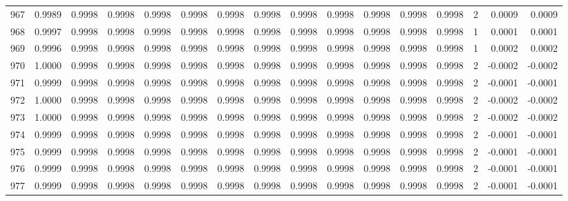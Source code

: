 \begin{tabular}{lrrrrrrrrrrrrrrr}
967 &      0.9989 &  0.9998 &  0.9998 &  0.9998 &  0.9998 &  0.9998 &  0.9998 &  0.9998 &  0.9998 &  0.9998 &   0.9998 &     0.9998 &      2 &                    0.0009 &                     0.0009 \\
968 &      0.9997 &  0.9998 &  0.9998 &  0.9998 &  0.9998 &  0.9998 &  0.9998 &  0.9998 &  0.9998 &  0.9998 &   0.9998 &     0.9998 &      1 &                    0.0001 &                     0.0001 \\
969 &      0.9996 &  0.9998 &  0.9998 &  0.9998 &  0.9998 &  0.9998 &  0.9998 &  0.9998 &  0.9998 &  0.9998 &   0.9998 &     0.9998 &      1 &                    0.0002 &                     0.0002 \\
970 &      1.0000 &  0.9998 &  0.9998 &  0.9998 &  0.9998 &  0.9998 &  0.9998 &  0.9998 &  0.9998 &  0.9998 &   0.9998 &     0.9998 &      2 &                   -0.0002 &                    -0.0002 \\
971 &      0.9999 &  0.9998 &  0.9998 &  0.9998 &  0.9998 &  0.9998 &  0.9998 &  0.9998 &  0.9998 &  0.9998 &   0.9998 &     0.9998 &      2 &                   -0.0001 &                    -0.0001 \\
972 &      1.0000 &  0.9998 &  0.9998 &  0.9998 &  0.9998 &  0.9998 &  0.9998 &  0.9998 &  0.9998 &  0.9998 &   0.9998 &     0.9998 &      2 &                   -0.0002 &                    -0.0002 \\
973 &      1.0000 &  0.9998 &  0.9998 &  0.9998 &  0.9998 &  0.9998 &  0.9998 &  0.9998 &  0.9998 &  0.9998 &   0.9998 &     0.9998 &      2 &                   -0.0002 &                    -0.0002 \\
974 &      0.9999 &  0.9998 &  0.9998 &  0.9998 &  0.9998 &  0.9998 &  0.9998 &  0.9998 &  0.9998 &  0.9998 &   0.9998 &     0.9998 &      2 &                   -0.0001 &                    -0.0001 \\
975 &      0.9999 &  0.9998 &  0.9998 &  0.9998 &  0.9998 &  0.9998 &  0.9998 &  0.9998 &  0.9998 &  0.9998 &   0.9998 &     0.9998 &      2 &                   -0.0001 &                    -0.0001 \\
976 &      0.9999 &  0.9998 &  0.9998 &  0.9998 &  0.9998 &  0.9998 &  0.9998 &  0.9998 &  0.9998 &  0.9998 &   0.9998 &     0.9998 &      2 &                   -0.0001 &                    -0.0001 \\
977 &      0.9999 &  0.9998 &  0.9998 &  0.9998 &  0.9998 &  0.9998 &  0.9998 &  0.9998 &  0.9998 &  0.9998 &   0.9998 &     0.9998 &      2 &                   -0.0001 &                    -0.0001 \\

\end{tabular}
